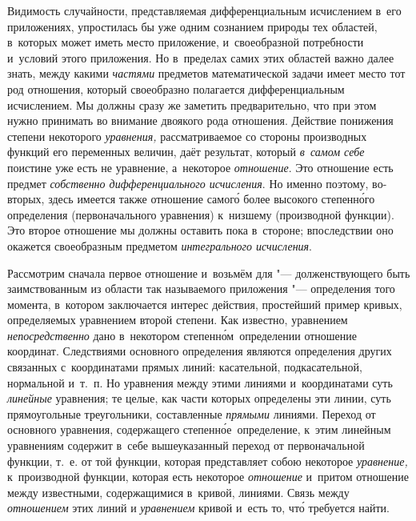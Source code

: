 Видимость случайности, представляемая дифференциальным исчислением в~его
приложениях, упростилась бы уже одним сознанием природы тех областей, в~которых
может иметь место приложение, и~своеобразной потребности и~условий этого
приложения. Но в~пределах самих этих областей важно далее знать, между какими
{\em частями} предметов математической задачи имеет место тот род отношения,
который своеобразно полагается дифференциальным исчислением. Мы должны сразу же
заметить предварительно, что при этом нужно принимать во внимание двоякого рода
отношения. Действие понижения степени некоторого {\em уравнения,}
рассматриваемое со стороны производных функций его переменных величин, даёт
результат, который {\em в~самом себе} поистине уже есть не уравнение,
а~некоторое {\em отношение}. Это отношение есть предмет
{\em собственно дифференциального исчисления}. Но именно поэтому, во-вторых,
здесь имеется также отношение самог\'{о} более высокого степенн\'{о}го определения
(первоначального уравнения) к~низшему (производной функции). Это второе
отношение мы должны оставить пока в~стороне; впоследствии оно окажется
своеобразным предметом {\em интегрального исчисления}.

Рассмотрим сначала первое отношение и~возьмём для "--- долженствующего быть
заимствованным из области так называемого приложения "--- определения того
момента, в~котором заключается интерес действия, простейший пример кривых,
определяемых уравнением второй степени. Как известно, уравнением
{\em непосредственно} дано в~некотором степенн\'{о}м~определении отношение
координат. Следствиями основного определения являются определения других
связанных с~координатами прямых линий: касательной, подкасательной, нормальной
и~т.~п. Но уравнения между этими линиями и~координатами суть {\em линейные}
уравнения; те целые, как части которых определены эти линии, суть прямоугольные
треугольники, составленные {\em прямыми} линиями. Переход от основного
уравнения, содержащего степенн\'{о}е~определение, к~этим линейным уравнениям
содержит в~себе вышеуказанный переход от первоначальной функции, т.~е. от той
функции, которая представляет собою некоторое {\em уравнение,} к~производной
функции, которая есть некоторое {\em отношение} и~притом отношение между
известными, содержащимися в~кривой, линиями. Связь между {\em отношением} этих
линий и {\em уравнением} кривой и~есть то, чт\'{о} требуется найти.

